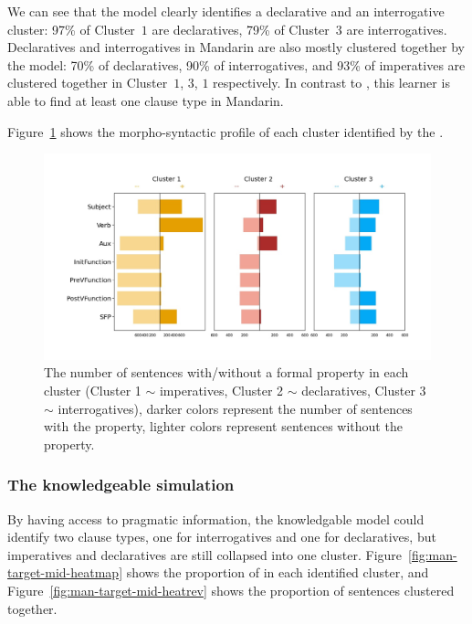 We can see that the \plearnerabbr{} model clearly identifies a declarative and an interrogative cluster: 97\% of Cluster~$1$ are declaratives, 79\% of Cluster~$3$ are interrogatives. Declaratives and interrogatives in Mandarin are also mostly clustered together by the model: 70\% of declaratives, 90\% of interrogatives, and 93\% of imperatives are clustered together in Cluster~$1$, $3$, $1$ respectively. In contrast to \dlearnerabbr{}, this learner is able to find at least one clause type in Mandarin.


Figure~\ref{fig:man-target-conservative-syncluster} shows the morpho-syntactic profile of each cluster identified by the \plearnerabbr{}. 

\begin{figure}[H]
    \centering
    \includegraphics[width=1\textwidth]{figures/man-target-conservative-syncluster.jpg}
    \caption{The number of sentences with/without a formal property in each cluster (Cluster 1 $\sim$ imperatives, Cluster 2 $\sim$ declaratives, Cluster 3 $\sim$ interrogatives), darker colors represent the number of sentences with the property, lighter colors represent sentences without the property.}
    \label{fig:man-target-conservative-syncluster}
\end{figure}

\subsubsection{The knowledgeable simulation}
By having access to pragmatic information, the knowledgable \plearnerabbr{} model could identify two clause types, one for interrogatives and one for declaratives, but imperatives and declaratives are still collapsed into one cluster. Figure~\ref{fig:man-target-mid-heatmap} shows the proportion of \diis{} in each identified cluster, and Figure~\ref{fig:man-target-mid-heatrev} shows the proportion of sentences clustered together. 

